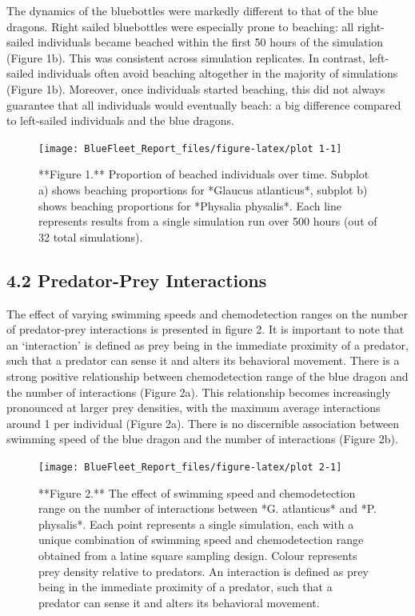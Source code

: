 \documentclass[
]{article}
\begin{document}
The dynamics of the bluebottles were markedly different to that of the
blue dragons. Right sailed bluebottles were especially prone to
beaching: all right-sailed individuals became beached within the first
50 hours of the simulation (Figure 1b). This was consistent across
simulation replicates. In contrast, left-sailed individuals often avoid
beaching altogether in the majority of simulations (Figure 1b).
Moreover, once individuals started beaching, this did not always
guarantee that all individuals would eventually beach: a big difference
compared to left-sailed individuals and the blue dragons.

\begin{figure}
\texttt{[image: BlueFleet\_Report\_files/figure-latex/plot 1-1]} \caption{**Figure 1.** Proportion of beached individuals over time. Subplot a) shows beaching proportions for *Glaucus atlanticus*, subplot b) shows beaching proportions for *Physalia physalis*. Each line represents results from a single simulation run over 500 hours (out of 32 total simulations).}\label{fig:plot 1}
\end{figure}

\hypertarget{predator-prey-interactions}{%
\subsection{4.2 Predator-Prey
Interactions}\label{predator-prey-interactions}}

The effect of varying swimming speeds and chemodetection ranges on the
number of predator-prey interactions is presented in figure 2. It is
important to note that an `interaction' is defined as prey being in the
immediate proximity of a predator, such that a predator can sense it and
alters its behavioral movement. There is a strong positive relationship
between chemodetection range of the blue dragon and the number of
interactions (Figure 2a). This relationship becomes increasingly
pronounced at larger prey densities, with the maximum average
interactions around 1 per individual (Figure 2a). There is no
discernible association between swimming speed of the blue dragon and
the number of interactions (Figure 2b).

\begin{figure}
\texttt{[image: BlueFleet\_Report\_files/figure-latex/plot 2-1]} \caption{**Figure 2.** The effect of swimming speed and chemodetection range on the number of interactions between *G. atlanticus* and *P. physalis*. Each point represents a single simulation, each with a unique combination of swimming speed and chemodetection range obtained from a latine square sampling design. Colour represents prey density relative to predators. An interaction is defined as prey being in the immediate proximity of a predator, such that a predator can sense it and alters its behavioral movement.}\label{fig:plot 2}
\end{figure}
\end{document}
